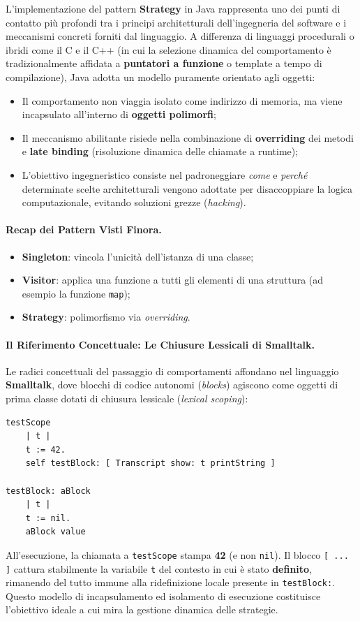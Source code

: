 \documentclass[12pt]{extarticle}
\begin{document}
\noindent L'implementazione del pattern \textbf{Strategy} in Java rappresenta uno dei punti di contatto più profondi tra i principi architetturali dell'ingegneria del software e i meccanismi concreti forniti dal linguaggio.
A differenza di linguaggi procedurali o ibridi come il C e il C++ (in cui la selezione dinamica del comportamento è tradizionalmente affidata a \textbf{puntatori a funzione} o template a tempo di compilazione), Java adotta un modello puramente orientato agli oggetti:
\begin{itemize}
    \item Il comportamento non viaggia isolato come indirizzo di memoria, ma viene incapsulato all'interno di \textbf{oggetti polimorfi};
    \item Il meccanismo abilitante risiede nella combinazione di \textbf{overriding} dei metodi e \textbf{late binding} (risoluzione dinamica delle chiamate a runtime);
    \item L'obiettivo ingegneristico consiste nel padroneggiare \textit{come} e \textit{perché} determinate scelte architetturali vengono adottate per disaccoppiare la logica computazionale, evitando soluzioni grezze (\textit{hacking}).
\end{itemize}

\paragraph{Recap dei Pattern Visti Finora.}
\begin{itemize}
    \item \textbf{Singleton}: vincola l'unicità dell'istanza di una classe;
    \item \textbf{Visitor}: applica una funzione a tutti gli elementi di una struttura (ad esempio la funzione \texttt{map});
    \item \textbf{Strategy}: polimorfismo via \textit{overriding}.
\end{itemize}

\paragraph{Il Riferimento Concettuale: Le Chiusure Lessicali di Smalltalk.}
Le radici concettuali del passaggio di comportamenti affondano nel linguaggio \textbf{Smalltalk}, dove blocchi di codice autonomi (\textit{blocks}) agiscono come oggetti di prima classe dotati di chiusura lessicale (\textit{lexical scoping}):
\begin{lstlisting}
testScope
    | t |
    t := 42.
    self testBlock: [ Transcript show: t printString ]

testBlock: aBlock
    | t |
    t := nil.
    aBlock value
\end{lstlisting}
\noindent All'esecuzione, la chiamata a \texttt{testScope} stampa \textbf{42} (e non \texttt{nil}). Il blocco \texttt{[ ... ]} cattura stabilmente la variabile \texttt{t} del contesto in cui è stato \textbf{definito}, rimanendo del tutto immune alla ridefinizione locale presente in \texttt{testBlock:}.
Questo modello di incapsulamento ed isolamento di esecuzione costituisce l'obiettivo ideale a cui mira la gestione dinamica delle strategie.
\end{document}
